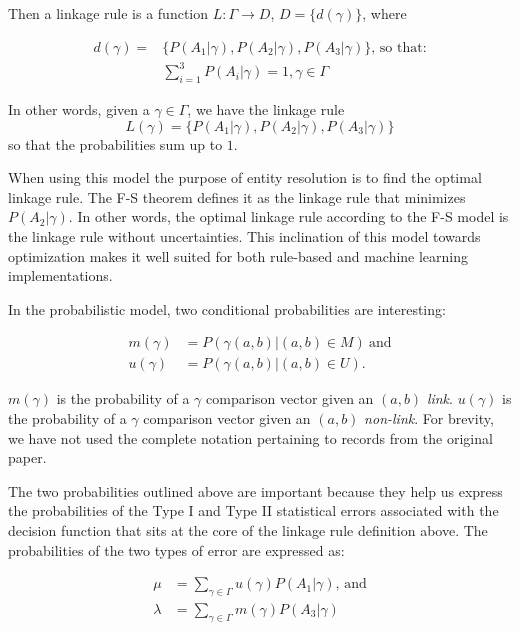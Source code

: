 Then a linkage rule is a function $L:\varGamma \rightarrow D$,
$D=\{d(\gamma)\}$, where

\begin{align}
    d(\gamma) = &\{P(A_1|\gamma),P(A_2|\gamma),P(A_3|\gamma)\}\textrm{, so
    that:}\nonumber\\
    &\sum_{i=1}^{3}P(A_i|\gamma) = 1\nonumber, \gamma \in \varGamma\nonumber
\end{align}

In other words, given a $\gamma \in \varGamma$, we have the linkage rule
\[
    L(\gamma) = \{P(A_1|\gamma), P(A_2|\gamma), P(A_3|\gamma)\}
\]
so that the probabilities sum up to $1$.

When using this model the purpose of entity resolution is to find the
optimal linkage rule.
The F-S theorem defines it as the linkage rule that minimizes
$P(A_2|\gamma)$.
In other words, the optimal linkage rule according to the F-S model is the
linkage rule without uncertainties.
This inclination of this model towards optimization makes it well suited for
both rule-based\cite{oyster2012} and machine learning\cite{deepm2020}
implementations.

In the probabilistic model, two conditional probabilities are interesting:

\begin{align}
    m(\gamma)&=P(\gamma(a, b) | (a, b) \in M)~\textrm{and}\nonumber\\
    u(\gamma)&=P(\gamma(a, b) | (a, b) \in U)\textrm{.}\nonumber
\end{align}

\noindent
$m(\gamma)$ is the probability of a $\gamma$ comparison vector given an
$(a, b)$ \textit{link}.
$u(\gamma)$ is the probability of a $\gamma$ comparison vector given an
$(a, b)$ \textit{non-link}.
For brevity, we have not used the complete notation pertaining to records
from the original paper.

The two probabilities outlined above are important because they help us
express the probabilities of the Type I and Type II statistical errors
associated with the decision function that sits at the core of the linkage
rule definition above.
The probabilities of the two types of error are expressed as:

\begin{align}
    \mu&=\sum_{\gamma \in \varGamma}u(\gamma)P(A_1|\gamma)\textrm{,~and}\nonumber\\
    \lambda&=\sum_{\gamma \in \varGamma}m(\gamma)P(A_3|\gamma)\nonumber
\end{align}

